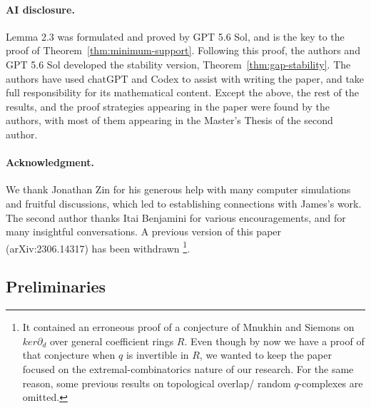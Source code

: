 \documentclass[11pt]{article}
\numberwithin{equation}{section}
\begin{document}
\paragraph{AI disclosure.}

Lemma 2.3 was formulated and proved by GPT 5.6 Sol, and is the key to the proof of Theorem~\ref{thm:minimum-support}. Following this proof, the authors and GPT 5.6 Sol developed the stability version, Theorem~\ref{thm:gap-stability}. The authors have used chatGPT and Codex to assist with writing the paper, and take full responsibility for its mathematical content. Except the above, the rest of the results, and the proof strategies appearing in the paper were found by the authors, with most of them appearing in the Master's Thesis of the second author. 







\paragraph{Acknowledgment.}

We thank Jonathan Zin for his generous help with many computer simulations and fruitful discussions, which led to establishing  connections with James's work. The second author thanks Itai Benjamini for various encouragements, and for many insightful conversations. A previous version of this paper (arXiv:2306.14317) has been withdrawn \footnote{It contained an erroneous proof of a conjecture of Mnukhin and Siemons on $ker \partial_d$ over general coefficient rings $R$. Even though by now we have a proof of that conjecture when $q$ is invertible in $R$, we wanted to keep the paper focused on the extremal-combinatorics nature of our research. For the same reason, some previous results on topological overlap/ random $q$-complexes are omitted. }.


\subsection{Preliminaries}
\end{document}
